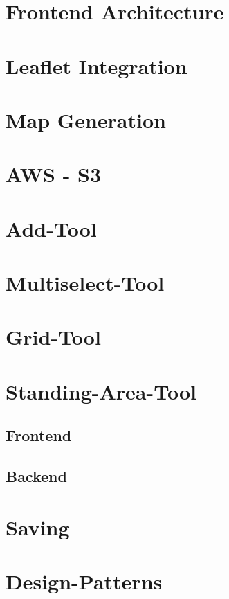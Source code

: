 \section{Frontend Architecture}

\section{Leaflet Integration}


\section{Map Generation}


\section{AWS - S3}


\section{Add-Tool}

\section{Multiselect-Tool}


\section{Grid-Tool}
\label{sec:grid-tool}

\section{Standing-Area-Tool}

\subsection{Frontend}

\subsection{Backend}


\section{Saving}


\section{Design-Patterns}
